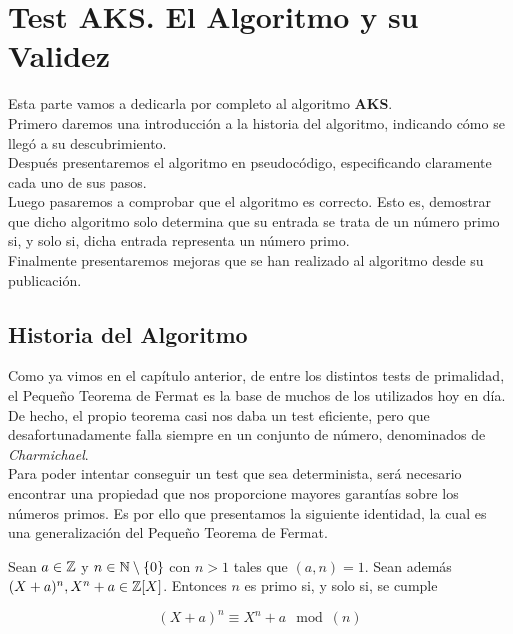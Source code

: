 \chapter{Test AKS. El Algoritmo y su Validez}

Esta parte vamos a dedicarla por completo al algoritmo \textbf{AKS}.\\

Primero daremos una introducción a la historia del algoritmo, indicando cómo se llegó a su descubrimiento.\\

Después presentaremos el algoritmo en pseudocódigo, especificando claramente cada uno de sus pasos.\\

Luego pasaremos a comprobar que el algoritmo es correcto. Esto es, demostrar que dicho algoritmo solo determina que su entrada se trata de un número primo si, y solo si, dicha entrada representa un número primo.\\

Finalmente presentaremos mejoras que se han realizado al algoritmo desde su publicación.

\section{Historia del Algoritmo}

Como ya vimos en el capítulo anterior, de entre los distintos tests de primalidad, el Pequeño Teorema de Fermat es la base de muchos de los utilizados hoy en día. De hecho, el propio teorema casi nos daba un test eficiente, pero que desafortunadamente falla siempre en un conjunto de número, denominados de \textit{Charmichael}.\\

Para poder intentar conseguir un test que sea determinista, será necesario encontrar una propiedad que nos proporcione mayores garantías sobre los números primos. Es por ello que presentamos la siguiente identidad, la cual es una generalización del Pequeño Teorema de Fermat.

\begin{proposicion}\label{lema_identidad_de_congruencias}
	Sean $a \in \mathbb{Z}$ y $n \in \mathbb{N} \setminus \{0\}$ con $n > 1$ tales que $(a, n) = 1$. Sean además $(X + a)^n, X^n + a \in \mathbb{Z}[X]$. Entonces $n$ es primo si, y solo si, se cumple
	
	\begin{equation}\label{identidad_original}
	(X + a)^n \equiv X^n + a \mod(n)
	\end{equation}
\end{proposicion}

